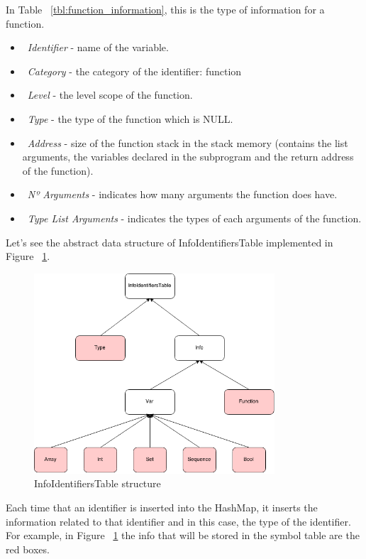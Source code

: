 \documentclass[
  oneside,
  11pt, a4paper,
  footinclude=true,
  headinclude=true,
  cleardoublepage=empty
]{scrbook}
\begin{document}
In Table ~\ref{tbl:function_information}, this is the type of information for a function.
\begin{itemize}
\item ~\textit{Identifier} - name of the variable.
\item ~\textit{Category} - the category of the identifier: function
\item ~\textit{Level} - the level scope of the function.
\item ~\textit{Type} - the type of the function which is NULL.
\item ~\textit{Address} - size of the function stack in the stack memory (contains the list arguments, the variables declared in the subprogram and the return address of the function).
\item ~\textit{Nº Arguments} - indicates how many arguments the function does have.
\item ~\textit{Type List Arguments} - indicates the types of each arguments of the function.
\end{itemize}




Let's see the abstract data structure of InfoIdentifiersTable implemented in Figure ~\ref{fig:infoidentifierstable_structure}.

\begin{figure}[h!]
  \centering
    \includegraphics[width=0.8\textwidth]{img/InfoIdentifiersTable.png}
    \caption{InfoIdentifiersTable structure}
    \label{fig:infoidentifierstable_structure}
\end{figure}

Each time that an identifier is inserted into the HashMap, it inserts the information related to that identifier and in this case, the type of the identifier.
For example, in Figure ~\ref{fig:infoidentifierstable_structure} the info that will be stored in the symbol table are the red boxes.
\end{document}
